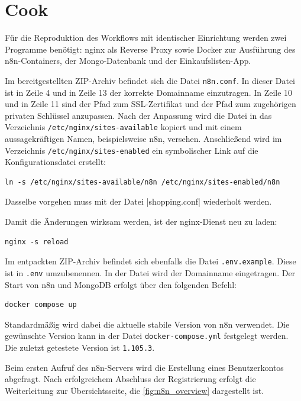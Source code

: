 \section{Cook}\label{sec:cook} %

Für die Reproduktion des Workflows mit identischer Einrichtung werden zwei Programme benötigt: nginx
als Reverse Proxy sowie Docker zur Ausführung des n8n-Containers, der Mongo-Datenbank und der
Einkaufslisten-App.

Im bereitgestellten ZIP-Archiv befindet sich die Datei \verb|n8n.conf|. In dieser Datei ist in Zeile 4
und in Zeile 13 der korrekte Domainname einzutragen. In Zeile 10 und in Zeile 11 sind der Pfad zum
SSL-Zertifikat und der Pfad zum zugehörigen privaten Schlüssel anzupassen. Nach der Anpassung wird
die Datei in das Verzeichnis \verb|/etc/nginx/sites-available| kopiert und mit einem aussagekräftigen
Namen, beispielsweise n8n, versehen. Anschließend wird im Verzeichnis
\verb|/etc/nginx/sites-enabled| ein
symbolischer Link auf die Konfigurationsdatei erstellt:

\begin{verbatim}
ln -s /etc/nginx/sites-available/n8n /etc/nginx/sites-enabled/n8n
\end{verbatim}

Dasselbe vorgehen muss mit der Datei \ver|shopping.conf| wiederholt werden.

Damit die Änderungen wirksam werden, ist der nginx-Dienst neu zu laden:

\begin{verbatim}
nginx -s reload
\end{verbatim}

Im entpackten ZIP-Archiv befindet sich ebenfalls die Datei \verb|.env.example|. Diese ist in
\verb|.env| umzubenennen. In der Datei wird der Domainname eingetragen. Der Start von n8n und
MongoDB erfolgt über den folgenden Befehl:

\begin{verbatim}
docker compose up
\end{verbatim}

Standardmäßig wird dabei die aktuelle stabile Version von n8n verwendet. Die gewünschte Version kann
in der Datei \verb|docker-compose.yml| festgelegt werden. Die zuletzt getestete Version ist
\verb|1.105.3|.

Beim ersten Aufruf des n8n-Servers wird die Erstellung eines Benutzerkontos abgefragt. Nach
erfolgreichem Abschluss der Registrierung erfolgt die Weiterleitung zur Übersichtsseite, die
\autoref{fig:n8n_overview} dargestellt ist.

